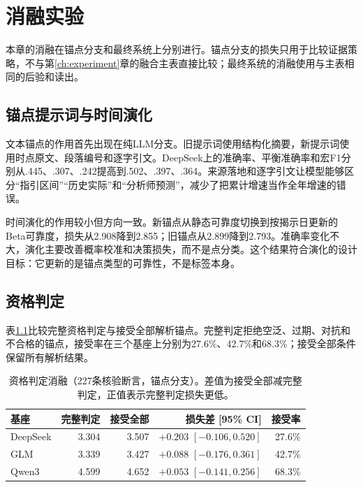 \chapter{消融实验}
\label{ch:ablation}

本章的消融在锚点分支和最终系统上分别进行。锚点分支的损失只用于比较证据策略，不与第\ref{ch:experiment}章的融合主表直接比较；最终系统的消融使用与主表相同的后验和读出。

\section{锚点提示词与时间演化}

文本锚点的作用首先出现在纯LLM分支。旧提示词使用结构化摘要，新提示词使用时点原文、段落编号和逐字引文。DeepSeek上的准确率、平衡准确率和宏F1分别从.445、.307、.242提高到.502、.397、.364。来源落地和逐字引文让模型能够区分“指引区间”“历史实际”和“分析师预测”，减少了把累计增速当作全年增速的错误。

时间演化的作用较小但方向一致。新锚点从静态可靠度切换到按揭示日更新的Beta可靠度，损失从2.908降到2.855；旧锚点从2.899降到2.793。准确率变化不大，演化主要改善概率校准和决策损失，而不是点分类。这个结果符合演化的设计目标：它更新的是锚点类型的可靠性，不是标签本身。

\section{资格判定}

表\ref{tab:qual-ablation}比较完整资格判定与接受全部解析锚点。完整判定拒绝空泛、过期、对抗和不合格的锚点，接受率在三个基座上分别为27.6\%、42.7\%和68.3\%；接受全部条件保留所有解析结果。

\begin{table}[htbp]
\centering
{}
\setlength{\tabcolsep}{4pt}
\caption{资格判定消融（227条核验断言，锚点分支）。差值为接受全部减完整判定，正值表示完整判定损失更低。}
\label{tab:qual-ablation}
\begin{tabular}{lrrrr}
\toprule
基座 & 完整判定 & 接受全部 & 损失差 [95\% CI] & 接受率 \\
\midrule
DeepSeek & 3.304 & 3.507 & $+0.203$ $[-0.106,0.520]$ & 27.6\% \\
GLM & 3.339 & 3.427 & $+0.088$ $[-0.176,0.361]$ & 42.7\% \\
Qwen3 & 4.599 & 4.652 & $+0.053$ $[-0.141,0.256]$ & 68.3\% \\
\bottomrule
\end{tabular}
\end{table}

